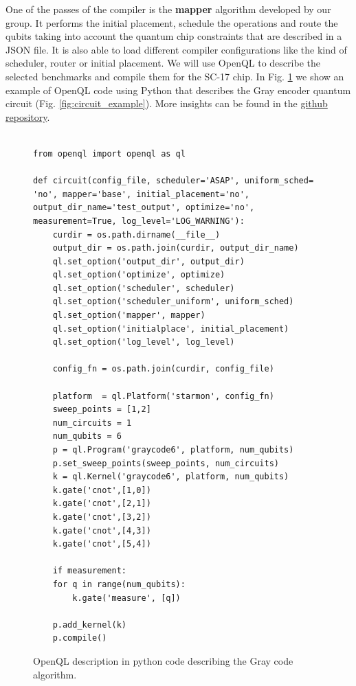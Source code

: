 One of the passes of the compiler is the \textbf{mapper} algorithm developed by our group. It performs the initial placement, schedule the operations and route the qubits taking into account the quantum chip constraints that are described in a JSON file.
It is also able to load different compiler configurations like the kind of scheduler, router or initial placement.
We will use OpenQL to describe the selected benchmarks and compile them for the SC-17 chip.
In Fig. \ref{code:openql_gray_code} we show an example of OpenQL code using Python that describes the Gray encoder quantum circuit (Fig. \ref{fig:circuit_example}).
More insights can be found in the \href{https://github.com/QE-Lab/OpenQL}{github repository}.

\begin{figure}
\centering
\begin{minipage}{\textwidth}

\begin{verbatim}

from openql import openql as ql

def circuit(config_file, scheduler='ASAP', uniform_sched= 'no', mapper='base', initial_placement='no', output_dir_name='test_output', optimize='no', measurement=True, log_level='LOG_WARNING'):
    curdir = os.path.dirname(__file__)
    output_dir = os.path.join(curdir, output_dir_name)
    ql.set_option('output_dir', output_dir)
    ql.set_option('optimize', optimize)
    ql.set_option('scheduler', scheduler)
    ql.set_option('scheduler_uniform', uniform_sched)
    ql.set_option('mapper', mapper)
    ql.set_option('initialplace', initial_placement)
    ql.set_option('log_level', log_level)

    config_fn = os.path.join(curdir, config_file)

    platform  = ql.Platform('starmon', config_fn)
    sweep_points = [1,2]
    num_circuits = 1
    num_qubits = 6
    p = ql.Program('graycode6', platform, num_qubits)
    p.set_sweep_points(sweep_points, num_circuits)
    k = ql.Kernel('graycode6', platform, num_qubits)
    k.gate('cnot',[1,0])
    k.gate('cnot',[2,1])
    k.gate('cnot',[3,2])
    k.gate('cnot',[4,3])
    k.gate('cnot',[5,4])

    if measurement:
	for q in range(num_qubits):
	    k.gate('measure', [q])

    p.add_kernel(k)
    p.compile()

\end{verbatim}

\caption{OpenQL description in python code describing the Gray code algorithm.}
\label{code:openql_gray_code}
\end{minipage}
\end{figure}

